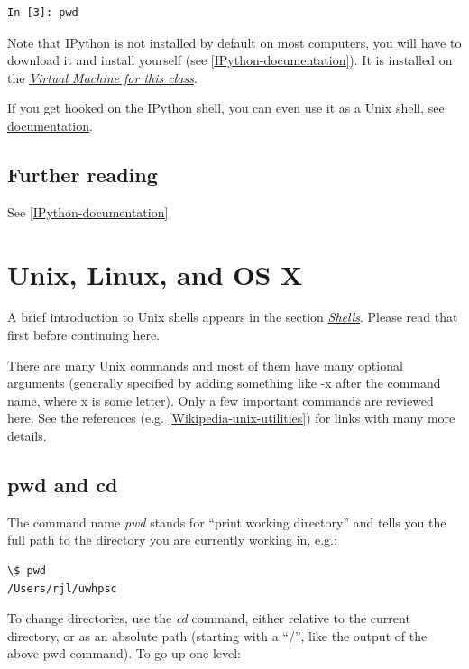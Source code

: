 \documentclass[letterpaper,10pt,english]{sphinxmanual}
\begin{document}
\begin{Verbatim}[commandchars=\\\{\}]
In [3]: pwd
\end{Verbatim}

Note that IPython is not installed by default on most computers, you will
have to download it and install yourself (see {\hyperref[biblio:ipython-documentation]{{[}IPython-documentation{]}}}).  It
is installed on the {\hyperref[vm:vm]{\emph{Virtual Machine for this class}}}.

If you get hooked on the IPython shell, you can even use it as a Unix shell,
see \href{http://ipython.scipy.org/doc/rel-0.10/html/interactive/shell.html}{documentation}.


\subsection{Further reading}
\label{shells:further-reading}
See {\hyperref[biblio:ipython-documentation]{{[}IPython-documentation{]}}}


\section{Unix, Linux, and OS X}
\label{unix:unix}\label{unix::doc}\label{unix:unix-linux-and-os-x}
A brief introduction to Unix shells appears in the section {\hyperref[shells:shells]{\emph{Shells}}}.
Please read that first before continuing here.

There are many Unix commands and most of them have many optional arguments
(generally specified by adding something like -x after the command name,
where x is some letter).   Only a few important commands are reviewed here.
See the references (e.g. {\hyperref[biblio:wikipedia-unix-utilities]{{[}Wikipedia-unix-utilities{]}}})
for links with many more details.


\subsection{pwd and cd}
\label{unix:pwd-and-cd}
The command name \emph{pwd} stands for ``print working directory'' and tells you
the full path to the directory you are currently working in, e.g.:

\begin{Verbatim}[commandchars=\\\{\}]
\$ pwd
/Users/rjl/uwhpsc
\end{Verbatim}

To change directories, use the \emph{cd} command, either relative to the current
directory, or as an absolute path (starting with a ``/'', like the output of
the above pwd command).  To go up one level:
\end{document}
